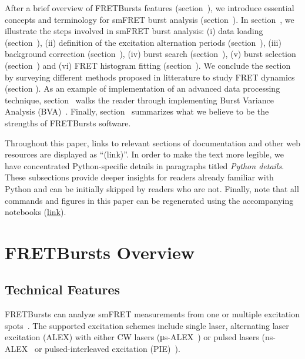 \documentclass[10pt,letterpaper]{article}
\begin{document}
After a brief overview of FRETBursts features (section~),
we introduce essential concepts and terminology for smFRET burst analysis
(section~).
In section~, we illustrate the steps involved
in smFRET burst analysis: (i) data loading (section~),
(ii) definition of the excitation alternation periods
(section~), (iii) background correction
(section~), (iv) burst search
(section~),
(v) burst selection (section~) and
(vi) FRET histogram fitting (section~).
We conclude the section by surveying different methods proposed
in litterature to study FRET dynamics (section ).
As an example
of implementation of an advanced data processing technique,
section~ walks the reader through implementing
Burst Variance Analysis (BVA)~\cite{Torella_2011}.
Finally, section~ summarizes what we believe
to be the strengths of FRETBursts software.

Throughout this paper,
links to relevant sections of documentation and other web resources
are displayed as ``(link)''.
In order to make the text more legible,
we have concentrated Python-specific details in paragraphs titled
\textit{Python details}. These subsections provide deeper insights for readers
already familiar with Python and can be initially skipped by readers who are not.
Finally, note that all commands and figures in this paper can be regenerated
using the accompanying notebooks
(\href{https://github.com/tritemio/fretbursts_paper}{link}).


\section*{FRETBursts Overview}
\label{sec:overview}

\subsection*{Technical Features}

FRETBursts can analyze smFRET measurements
from one or multiple excitation spots~\cite{Ingargiola_2013}. The supported
excitation schemes include single laser, alternating laser excitation (ALEX)
with either CW lasers (μs-ALEX~\cite{Kapanidis_2005})
or pulsed lasers (ns-ALEX~\cite{Laurence_2005} or
pulsed-interleaved excitation (PIE)~\cite{M_ller_2005}).
\end{document}
